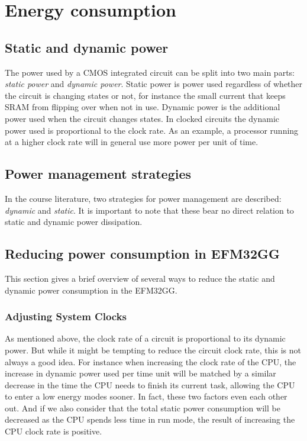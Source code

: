 \section{Energy consumption}

\subsection{Static and dynamic power}
The power used by a CMOS integrated circuit can be split into two main parts: \emph{static power} and \emph{dynamic power}. Static power is power used regardless of whether the circuit is changing states or not, for instance the small current that keeps SRAM from flipping over when not in use. Dynamic power is the additional power used when the circuit changes states. In clocked circuits the dynamic power used is proportional to the clock rate. As an example, a processor running at a higher clock rate will in general use more power per unit of time.\cite{efm32-energy-optimization}

\subsection{Power management strategies}
In the course literature, two strategies for power management are described: \emph{dynamic} and \emph{static}. It is important to note that these bear no direct relation to static and dynamic power dissipation. 

\subsection{Reducing power consumption in EFM32GG}
This section gives a brief overview of several ways to reduce the static and dynamic power consumption in the EFM32GG.

\subsubsection{Adjusting System Clocks}
As mentioned above, the clock rate of a circuit is proportional to its dynamic power. But while it might be tempting to reduce the circuit clock rate, this is not always a good idea. For instance when increasing the clock rate of the CPU, the increase in dynamic power used per time unit will be matched by a similar decrease in the time the CPU needs to finish its current task, allowing the CPU to enter a low energy modes sooner. In fact, these two factors even each other out. And if we also consider that the total static power consumption will be decreased as the CPU spends less time in run mode, the result of increasing the CPU clock rate is positive. %


